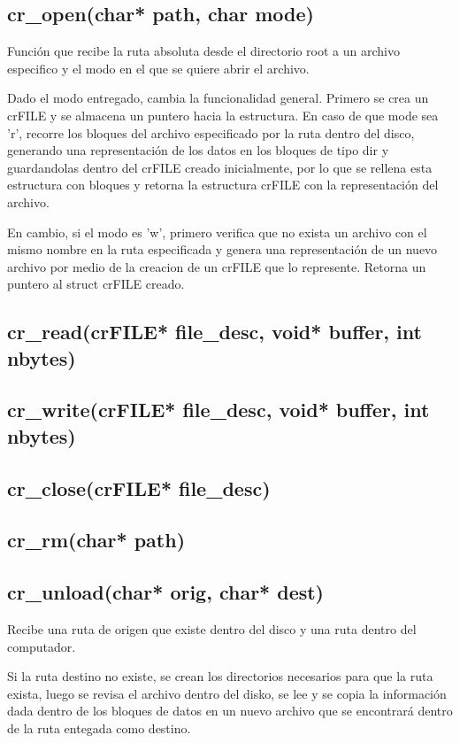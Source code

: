 \documentclass[12pt]{article}
\begin{document}
\subsection{cr\_open(char* path, char mode)}
Función que recibe la ruta absoluta desde el directorio root a un archivo  especifico y el modo en el que se quiere abrir el archivo.

Dado el modo entregado, cambia la funcionalidad general. Primero se crea un crFILE y se almacena un puntero hacia la estructura. En caso de que mode sea 'r', recorre los bloques del archivo especificado por la ruta dentro del disco, generando una representación de los datos en los bloques de tipo dir y guardandolas dentro del crFILE creado inicialmente, por lo que se rellena esta estructura con bloques y retorna la estructura crFILE con la representación del archivo.

En cambio, si el modo es 'w', primero verifica que no exista un archivo con el mismo nombre en la ruta especificada y genera una representación de un nuevo archivo por medio de la creacion de un crFILE que lo represente. Retorna un puntero al struct crFILE creado.

\subsection{cr\_read(crFILE* file\_desc, void* buffer, int nbytes)}


\subsection{cr\_write(crFILE* file\_desc, void* buffer, int nbytes)}

\subsection{cr\_close(crFILE* file\_desc)}

\subsection{cr\_rm(char* path)}

\subsection{cr\_unload(char* orig, char* dest)}
Recibe una ruta de origen que existe dentro del disco y una ruta dentro del computador.

Si la ruta destino no existe, se crean los directorios necesarios para que la ruta exista, luego se revisa el archivo dentro del disko, se lee y se copia la información dada dentro de los bloques de datos en un nuevo archivo que se encontrará dentro de la ruta entegada como destino.
\end{document}
